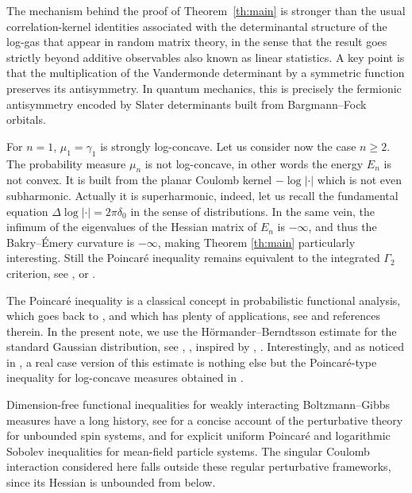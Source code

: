 \documentclass[11pt,reqno]{amsart}
\numberwithin{equation}{section}%
\numberwithin{figure}{section}%
\numberwithin{table}{section}
\theoremstyle{plain}
\theoremstyle{definition}
\begin{document}
The mechanism behind the proof of Theorem~\ref{th:main} is stronger than the
usual correlation-kernel identities associated with the determinantal
structure of the log-gas that appear in random matrix theory, in the sense
that the result goes strictly beyond additive observables also known as linear
statistics. A key point is that the multiplication of the Vandermonde
determinant by a symmetric function preserves its antisymmetry. In quantum
mechanics, this is precisely the fermionic antisymmetry encoded by Slater
determinants built from Bargmann--Fock orbitals.

For $n=1$, $\mu_1=\gamma_1$ is strongly log-concave. Let us consider now the
case $n\geq2$. The probability measure $\mu_n$ is not log-concave, in other
words the energy $E_n$ is not convex. It is built from the planar Coulomb
kernel $-\log\left|\cdot\right|$ which is not even subharmonic. Actually it is
superharmonic, indeed, let us recall the fundamental equation
$\Delta\log\left|\cdot\right|=2\pi\delta_0$ in the sense of distributions. In
the same vein, the infimum of the eigenvalues of the Hessian matrix of $E_n$
is $-\infty$, and thus the Bakry--Émery curvature is $-\infty$, making Theorem
\ref{th:main} particularly interesting. Still the Poincaré inequality remains
equivalent to the integrated $\Gamma_2$ criterion, see
\cite{BakryGentilLedoux}, or \cite{AneEtAlLSI}.

The Poincaré inequality is a classical concept in probabilistic functional
analysis, which goes back to \cite{zbMATH02695433,Poincare1890}, and which has
plenty of applications, see \citet[Ch.~4]{BakryGentilLedoux} and references
therein. In the present note, we use the Hörmander--Berndtsson estimate for
the standard Gaussian distribution, see \citet[Th.~1.3]{BerndtssonThingsDbar},
\citet[Th.~1.1.1]{BerndtssonDbarMethods}, inspired by
\citet[Th.~2.2.1]{HormanderL2Dbar},
\citet[Ch.~4]{HormanderComplexAnalysisSeveralVariables}. Interestingly, and as
noticed in \citet[p.~402]{CorderoErausquinBerndtssonPrekopa}, a real case
version of this estimate is nothing else but the Poincaré-type inequality for
log-concave measures obtained in \citet[Th.~4.1]{BrascampLiebExtensions}.

Dimension-free functional inequalities for weakly interacting Boltzmann--Gibbs
measures have a long history, see \cite{LedouxUnboundedSpinRevisited} for a
concise account of the perturbative theory for unbounded spin systems, and
\cite*{GuillinLiuWuZhang} for explicit uniform Poincaré and logarithmic Sobolev
inequalities for mean-field particle systems. The singular Coulomb interaction
considered here falls outside these regular perturbative frameworks, since its
Hessian is unbounded from below.
\end{document}
